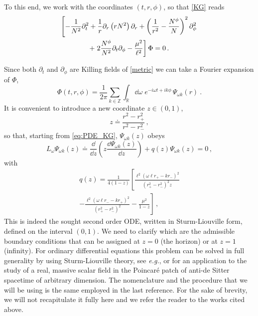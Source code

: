 \documentclass[aps, prd, amsmath, floats, floatfix, twocolumn, nofootinbib, superscriptaddress, showpacs]{revtex4-1}
\begin{document}
	To this end, we work with the coordinates $(t,r,\phi)$, so that \eqref{KG} reads
	\begin{gather} 
	 \left[-\frac{1}{N^2}\partial^2_t+\frac{1}{r}\partial_r\left(rN^2\right)\partial_r+\left(\frac{1}{r^2}-\frac{N^\phi}{N}\right)^2\partial^2_\phi \right. \notag\\
	+\left.2\frac{N^\phi}{N^2}\partial_t\partial_\phi-\frac{\mu^2}{\ell^2}\right]\Phi=0 \, . \label{eq:PDE_KG}
	\end{gather}
	
Since both $\partial_t$ and $\partial_\phi$ are Killing fields of \eqref{metric} we can take a Fourier expansion of $\Phi$,
	\begin{equation}
	\Phi(t,r,\phi)=\frac{1}{2\pi}\sum_{k\in\mathbb{Z}}\int_\mathbb{R} \dd\omega\;  e^{-i\omega t + i k \phi} \, \Psi_{\omega k}(r) \ .
	\end{equation}	
	It is convenient to introduce a new coordinate $z\in (0,1)$,
	\begin{equation}\label{eq:z_coordinate}
	z \doteq \frac{r^2-r_+^2}{r^2-r_-^2} \, ,
	\end{equation}
    so that, starting from \eqref{eq:PDE_KG}, $\Psi_{\omega k}(z)$ obeys
	\begin{equation} \label{eq:Sturm_Liouville_form}
		L_\omega \Psi_{\omega k}(z) \doteq \frac{\dd}{\dd z}\left(z\frac{\dd\Psi_{\omega k}(z)}{\dd z}\right)+q(z)\Psi_{\omega k}(z)=0 \, ,
	\end{equation}
	with
	\begin{multline}
		q(z) = \frac{1}{4(1-z)} \left[ \frac{\ell^2(\omega\ell r_{+} - k r_{-})^2}{(r_{+}^2-r_{-}^2)^2 z} \right. \\
		\left. -\frac{\ell^2(\omega\ell r_{-} - k r_{+})^2}{(r_{+}^2-r_{-}^2)^2}
		-\frac{\mu^2}{1-z} \right] \, ,
	\end{multline}
	This is indeed the sought second order ODE, written in Sturm-Liouville
	form, defined on the interval $(0,1)$. We need to clarify
	which are the admissible boundary conditions that can be assigned at
	$z=0$ (the horizon) or at $z=1$ (infinity). For ordinary differential
	equations this problem can be solved in full generality by using
	Sturm-Liouville theory, see {\it e.g.}, \cite{Zettl:2005,weidmann} or
	\cite{Dappiaggi:2016fwc} for an application to the study of a real,
	massive scalar field in the Poincar\'e patch of anti-de Sitter
	spacetime of arbitrary dimension. The nomenclature and the procedure
	that we will be using is the same employed in the last reference.
	For the sake of brevity, we will not recapitulate it fully here and we refer
	the reader to the works cited above.
\end{document}

